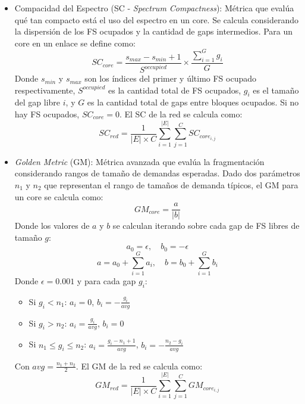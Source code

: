 \begin{itemize}
    \item Compacidad del Espectro (SC - \textit{Spectrum Compactness}): Métrica que evalúa qué tan compacto está el uso del espectro en un core. Se calcula considerando la dispersión de los FS ocupados y la cantidad de gaps intermedios. Para un core en un enlace se define como:
    \begin{equation}
        SC_{core} = \frac{s_{max} - s_{min} + 1}{S^{occupied}} \times \frac{\sum_{i=1}^{G} g_i}{G}
    \end{equation}
    Donde \(s_{min}\) y \(s_{max}\) son los índices del primer y último FS ocupado respectivamente, \(S^{occupied}\) es la cantidad total de FS ocupados, \(g_i\) es el tamaño del gap libre \(i\), y \(G\) es la cantidad total de gaps entre bloques ocupados. Si no hay FS ocupados, \(SC_{core} = 0\).
    El SC de la red se calcula como:
    \begin{equation}
        SC_{red} = \frac{1}{\left | E \right | \times C} \sum_{i=1}^{\left | E \right |} \sum_{j=1}^{C} SC_{core_{i,j}}
    \end{equation}
    
    \item \textit{Golden Metric} (GM): Métrica avanzada que evalúa la fragmentación considerando rangos de tamaño de demandas esperadas. Dado dos parámetros \(n_1\) y \(n_2\) que representan el rango de tamaños de demanda típicos, el GM para un core se calcula como:
    \begin{equation}
        GM_{core} = \frac{a}{|b|}
    \end{equation}
    Donde los valores de \(a\) y \(b\) se calculan iterando sobre cada gap de FS libres de tamaño \(g\):
    \begin{equation}
        a_0 = \epsilon, \quad b_0 = -\epsilon
    \end{equation}
    \begin{equation}
        a = a_0 + \sum_{i=1}^{G} a_i, \quad b = b_0 + \sum_{i=1}^{G} b_i
    \end{equation}
    Donde \(\epsilon = 0.001\) y para cada gap \(g_i\):
    \begin{itemize}
        \item Si \(g_i < n_1\): \(a_i = 0\), \(b_i = -\frac{g_i}{avg}\)
        \item Si \(g_i > n_2\): \(a_i = \frac{g_i}{avg}\), \(b_i = 0\)
        \item Si \(n_1 \leq g_i \leq n_2\): \(a_i = \frac{g_i - n_1 + 1}{avg}\), \(b_i = -\frac{n_2 - g_i}{avg}\)
    \end{itemize}
    Con \(avg = \frac{n_1 + n_2}{2}\).
    El GM de la red se calcula como:
    \begin{equation}
        GM_{red} = \frac{1}{\left | E \right | \times C} \sum_{i=1}^{\left | E \right |} \sum_{j=1}^{C} GM_{core_{i,j}}
    \end{equation}
    

\end{itemize}
